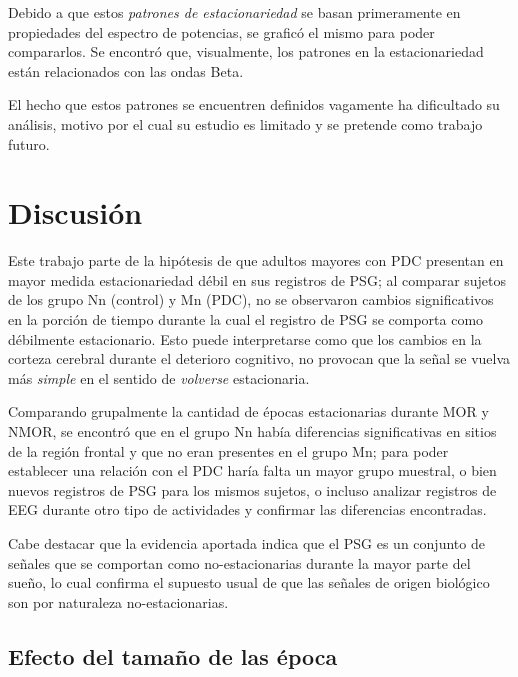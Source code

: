 Debido a que estos \textit{patrones de estacionariedad} se basan primeramente en propiedades del
espectro de potencias, se graficó el mismo para poder compararlos. Se encontró que, visualmente,
los patrones en la estacionariedad están relacionados con las ondas Beta.

El hecho que estos patrones se encuentren definidos vagamente ha dificultado su análisis, motivo
por el cual su estudio es limitado y se pretende como trabajo futuro.


\section{Discusión}

Este trabajo parte de la hipótesis de que adultos mayores con PDC presentan en mayor medida 
estacionariedad débil en sus registros de PSG; al comparar sujetos de los grupo Nn (control) y Mn 
(PDC), no se observaron cambios significativos en la porción de tiempo durante la cual el registro 
de PSG se comporta como débilmente estacionario. 
Esto puede interpretarse como que los cambios en la corteza cerebral durante el deterioro 
cognitivo, no provocan que  la señal se vuelva más \textit{simple} en el sentido de 
\textit{volverse} estacionaria.

Comparando grupalmente la cantidad de épocas estacionarias durante MOR y NMOR, se encontró que en 
el grupo Nn había diferencias significativas en sitios de la región frontal y que no eran presentes
en el grupo Mn; para poder establecer una relación con el PDC haría falta un mayor grupo muestral, 
o bien nuevos registros de PSG para los mismos sujetos, o incluso analizar registros de EEG durante 
otro tipo de actividades y confirmar las diferencias encontradas.

Cabe destacar que la evidencia aportada indica que el PSG es un conjunto de señales que se comportan
como no-estacionarias durante la mayor parte del sueño, lo cual confirma el supuesto usual de que 
las señales de origen biológico son por naturaleza no-estacionarias. 

\subsection{Efecto del tamaño de las época}

